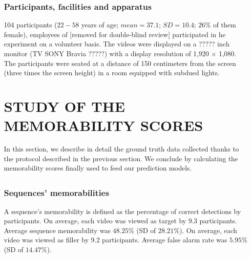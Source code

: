 \documentclass[sigconf]{acmart}
\begin{document}
\subsubsection{Participants, facilities and apparatus}
104 participants ($22-58$ years of age; $mean = 37.1 $; $SD = 10.4 $; $26\%$ of them female), employees of [removed for double-blind review] participated in he experiment on a volunteer basis. %
The videos were displayed on a ????? inch monitor (TV SONY Bravia ?????) with a display resolution of 1,920 $\times$ 1,080. The participants were seated at a distance of 150 centimeters from the screen (three times the screen height) in a room equipped with subdued lights.

\section{STUDY OF THE MEMORABILITY SCORES}
In this section, we describe in detail the ground truth data collected thanks to the protocol described in the previous section.
We conclude by calculating the memorability scores finally used to feed our prediction models.

\subsection{}


\subsubsection{Sequences' memorabilities}
A sequence's memorability is defined as the percentage of correct detections by participants.
On average, each video was viewed as target by $9.3$ participants. Average sequence memorability was $48.25\%$ (SD of $28.21\%$).
On average, each video was viewed as filler by $9.2$ participants. Average false alarm rate was $5.95\%$ (SD of $14.47\%$). 
\end{document}
